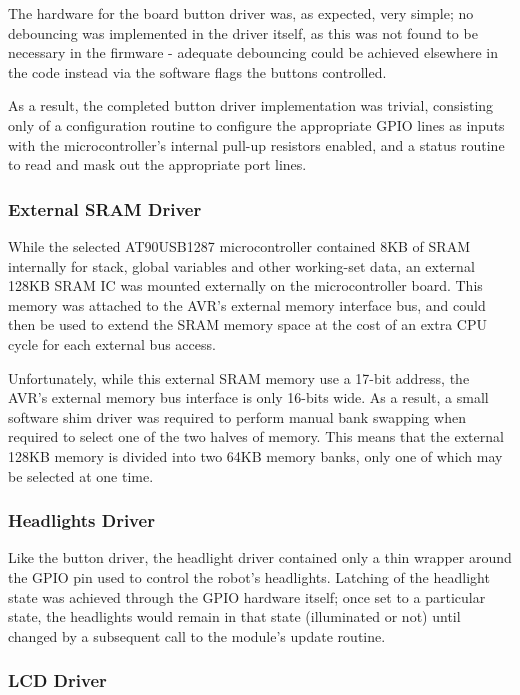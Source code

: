 The hardware for the board button driver was, as expected, very simple; no debouncing was implemented in the driver itself, as this was not found to be necessary in the firmware - adequate debouncing could be achieved elsewhere in the code instead via the software flags the buttons controlled.

As a result, the completed button driver implementation was trivial, consisting only of a configuration routine to configure the appropriate GPIO lines as inputs with the microcontroller's internal pull-up resistors enabled, and a status routine to read and mask out the appropriate port lines.

\FloatBarrier
\subsubsection{External SRAM Driver}

While the selected AT90USB1287 microcontroller contained 8KB of SRAM internally for stack, global variables and other working-set data, an external 128KB SRAM IC was mounted externally on the microcontroller board. This memory was attached to the AVR's external memory interface bus, and could then be used to extend the SRAM memory space at the cost of an extra CPU cycle for each external bus access.

Unfortunately, while this external SRAM memory use a 17-bit address, the AVR's external memory bus interface is only 16-bits wide. As a result, a small software shim driver was required to perform manual bank swapping when required to select one of the two halves of memory. This means that the external 128KB memory is divided into two 64KB memory banks, only one of which may be selected at one time.

\FloatBarrier
\subsubsection{Headlights Driver}

Like the button driver, the headlight driver contained only a thin wrapper around the GPIO pin used to control the robot's headlights. Latching of the headlight state was achieved through the GPIO hardware itself; once set to a particular state, the headlights would remain in that state (illuminated or not) until changed by a subsequent call to the module's update routine.

\FloatBarrier
\subsubsection{LCD Driver}


